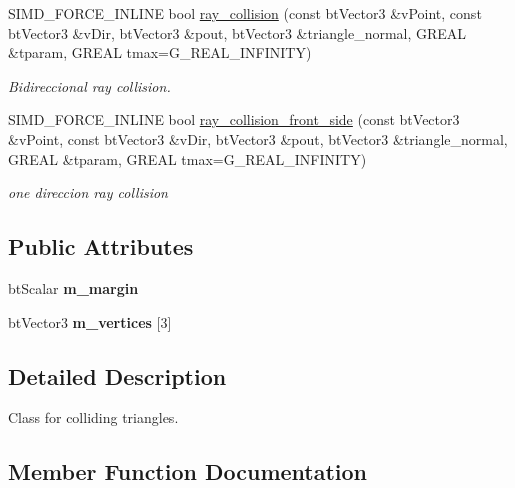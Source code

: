 \begin{DoxyCompactItemize}
S\+I\+M\+D\+\_\+\+F\+O\+R\+C\+E\+\_\+\+I\+N\+L\+I\+NE bool \hyperlink{classGIM__TRIANGLE_a2942ca686a994c2d112ad356c2a4e7ad}{ray\+\_\+collision} (const bt\+Vector3 \&v\+Point, const bt\+Vector3 \&v\+Dir, bt\+Vector3 \&pout, bt\+Vector3 \&triangle\+\_\+normal, G\+R\+E\+AL \&tparam, G\+R\+E\+AL tmax=G\+\_\+\+R\+E\+A\+L\+\_\+\+I\+N\+F\+I\+N\+I\+TY)
\begin{DoxyCompactList}\small\item\em Bidireccional ray collision. \end{DoxyCompactList}\item 
\mbox{\label{classGIM__TRIANGLE_a2b333284fd573994acf89b9085a61927}} 
S\+I\+M\+D\+\_\+\+F\+O\+R\+C\+E\+\_\+\+I\+N\+L\+I\+NE bool \hyperlink{classGIM__TRIANGLE_a2b333284fd573994acf89b9085a61927}{ray\+\_\+collision\+\_\+front\+\_\+side} (const bt\+Vector3 \&v\+Point, const bt\+Vector3 \&v\+Dir, bt\+Vector3 \&pout, bt\+Vector3 \&triangle\+\_\+normal, G\+R\+E\+AL \&tparam, G\+R\+E\+AL tmax=G\+\_\+\+R\+E\+A\+L\+\_\+\+I\+N\+F\+I\+N\+I\+TY)
\begin{DoxyCompactList}\small\item\em one direccion ray collision \end{DoxyCompactList}\end{DoxyCompactItemize}
\subsection*{Public Attributes}
\begin{DoxyCompactItemize}
\item 
\mbox{\label{classGIM__TRIANGLE_a00e342655f73bea235450f154cc65091}} 
bt\+Scalar {\bfseries m\+\_\+margin}
\item 
\mbox{\label{classGIM__TRIANGLE_a1284827b1f29ce1375ef9a36159e05ed}} 
bt\+Vector3 {\bfseries m\+\_\+vertices} \mbox{[}3\mbox{]}
\end{DoxyCompactItemize}


\subsection{Detailed Description}
Class for colliding triangles. 

\subsection{Member Function Documentation}
\mbox{\label{classGIM__TRIANGLE_ac8930de461fb35af599d7a28d0a02229}} 
